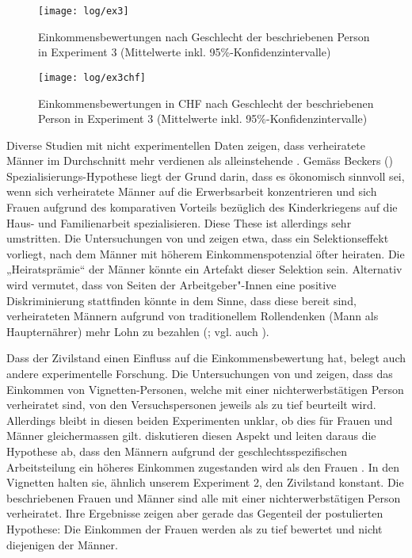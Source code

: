 \documentclass[a4paper,12pt]{article}
\renewcommand{\baselinestretch}{1.1}
\newif\ifcomments
\newcommand{\comment}[1]{%
    \ifcomments\marginpar{\renewcommand{\baselinestretch}{1}\tiny\hspace*{-1.1em}\colorbox{gray!20}%
    {\textcolor{red}{\parbox[t]{.9in}{\raggedright #1}}}}\fi}
\begin{document}
\begin{figure}[p]\centering
    \texttt{[image: log/ex3]}
    \caption{Einkommensbewertungen nach Geschlecht der beschriebenen Person in 
    Experiment 3 (Mittelwerte inkl. 95\%-Konfidenzintervalle)}\label{fig-ex3}
\end{figure}

\begin{figure}[p]\centering
    \texttt{[image: log/ex3chf]}
    \caption{Einkommensbewertungen in CHF nach Geschlecht der beschriebenen Person in 
    Experiment 3 (Mittelwerte inkl. 95\%-Konfidenzintervalle)}\label{fig-ex3chf}
\end{figure}

Diverse Studien mit nicht experimentellen Daten zeigen, dass verheiratete
Männer im Durchschnitt mehr verdienen als alleinstehende
\citep{Budig-Lim-2016,Killewald-Gough-2013}. Gemäss Beckers
(\citeyear{Becker-1981}) Spezialisierungs-Hypothese liegt der Grund darin, dass
es ökonomisch sinnvoll sei, wenn sich verheiratete Männer auf die Erwerbsarbeit
konzentrieren und sich Frauen aufgrund des komparativen Vorteils bezüglich des
Kinderkriegens auf die Haus- und Familienarbeit spezialisieren. Diese These ist
allerdings sehr umstritten. Die Untersuchungen von \citet{Ludwig-Bruederl-2011}
und \citet{Jakobsson-Kotsadam-2016} zeigen etwa, dass ein Selektionseffekt
vorliegt, nach dem Männer mit höherem Einkommenspotenzial öfter heiraten. Die
„Heiratsprämie“ der Männer könnte ein Artefakt dieser Selektion sein.
Alternativ wird vermutet, dass von Seiten der Arbeitgeber"-Innen eine positive
Diskriminierung stattfinden könnte in dem Sinne, dass diese bereit sind,
verheirateten Männern aufgrund von traditionellem Rollendenken (Mann
als Haupternährer) mehr Lohn zu bezahlen (\citealp{Budig-Lim-2016}; vgl. auch
\citealp{Killewald-Gough-2013}).

Dass der Zivilstand einen Einfluss auf die Einkommensbewertung hat, belegt auch
andere experimentelle Forschung. Die Untersuchungen von \citet{Gatskova-2015} und 
\citet{Sauer-etal-2009} zeigen, dass das Einkommen von Vignetten-Personen, welche mit
einer nichterwerbstätigen Person verheiratet sind, von den Versuchspersonen
jeweils als zu tief beurteilt wird. Allerdings bleibt in diesen beiden
Experimenten unklar, ob dies für Frauen und Männer gleichermassen gilt. 
\citet{Shamon-Duelmer-2014} diskutieren diesen Aspekt und leiten daraus die Hypothese ab,
dass den Männern aufgrund der geschlechtsspezifischen Arbeitsteilung ein
höheres Einkommen zugestanden wird als den Frauen \citep[348]{Shamon-Duelmer-2014}.
In den Vignetten halten sie, ähnlich unserem Experiment 2, den Zivilstand
konstant. Die beschriebenen Frauen und Männer sind alle mit einer
nichterwerbstätigen Person verheiratet. Ihre Ergebnisse zeigen aber gerade das
Gegenteil der postulierten Hypothese: Die Einkommen der Frauen werden als zu
tief bewertet und nicht diejenigen der Männer. \comment{Da könnte auch ein
„Kompensations-Effekt“ eine Rolle spielen, denn dass in verheirateten Paaren
nur die Frau erwerbstätig ist, ist ungewöhnlich und hat vermutlich meist
gewichtige Gründe (z.B. Arbeitslosigkeit oder Krankheit des Mannes).}
\end{document}

